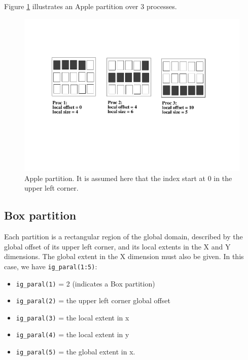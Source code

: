 Figure \ref{apple_partition} illustrates an Apple partition over 3
processes.
\begin{figure}
  \includegraphics[scale=.6]{figures/apple_new}
  \caption{Apple partition. It is assumed here that the index start at
    0 in the upper left corner.}
  \label{apple_partition}
\end{figure}


\subsection{Box partition}

Each partition is a rectangular region of the global domain, described
by the global offset of its upper left corner, and its local extents
in the X and Y dimensions. The global extent in the X dimension must
also be given. In this case, we have {\tt ig\_paral(1:5)}:
\begin{itemize}
\item {\tt ig\_paral(1)} = 2 (indicates a Box partition)
\item {\tt ig\_paral(2)} = the upper left corner global offset
\item {\tt ig\_paral(3)} = the local extent in x
\item {\tt ig\_paral(4)} = the local extent in y
\item {\tt ig\_paral(5)} = the global extent in x.
\end{itemize}

